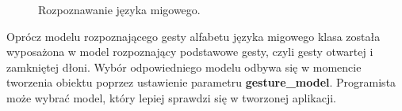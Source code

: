 \begin{figure}[H]
    \centering
    \hfill
    \hfill
    \caption{Rozpoznawanie języka migowego.}
\end{figure}

\quad Oprócz modelu rozpoznającego gesty alfabetu języka migowego klasa została wyposażona w model rozpoznający podstawowe gesty, czyli gesty otwartej i zamkniętej dłoni. Wybór odpowiedniego modelu odbywa się w momencie tworzenia obiektu poprzez ustawienie parametru \textbf{gesture\_model}. Programista może wybrać model, który lepiej sprawdzi się w tworzonej aplikacji. 

